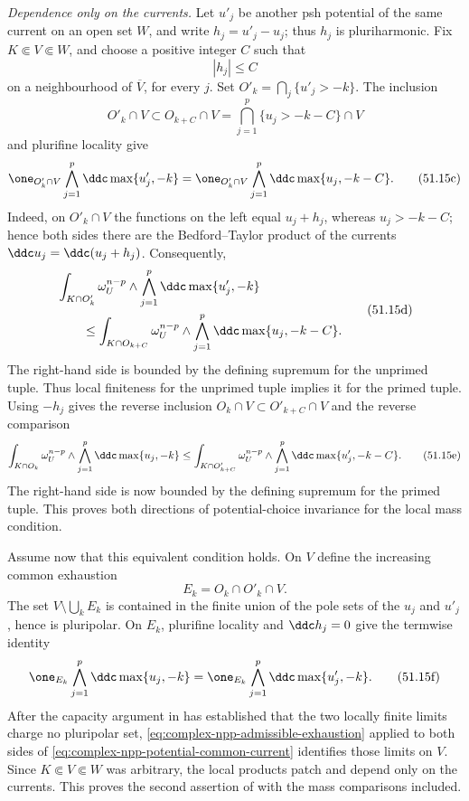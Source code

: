 \emph{Dependence only on the currents.}  Let $u'_j$ be another psh
potential of the same current on an open set $W$, and write
$h_j=u'_j-u_j$; thus $h_j$ is pluriharmonic.  Fix
$K\Subset V\Subset W$, and choose a positive integer $C$ such that
\[
                         |h_j|\leq C
\]
on a neighbourhood of $\overline V$, for every $j$.  Set
$O'_k=\bigcap_j\{u'_j>-k\}$.  The inclusion
\[
 O'_k\cap V\subset O_{k+C}\cap V
       =\bigcap_{j=1}^p\{u_j>-k-C\}\cap V
\tag{51.15b}\label{eq:complex-npp-potential-locus-forward}
\]
and plurifine locality give
\[
 \one_{O'_k\cap V}\bigwedge_{j=1}^p\ddc\max\{u'_j,-k\}
 =\one_{O'_k\cap V}\bigwedge_{j=1}^p\ddc\max\{u_j,-k-C\}.
\tag{51.15c}\label{eq:complex-npp-potential-current-forward}
\]
Indeed, on $O'_k\cap V$ the functions on the left equal $u_j+h_j$,
whereas $u_j>-k-C$; hence both sides there are the Bedford--Taylor product
of the currents $\ddc u_j=\ddc(u_j+h_j)$.  Consequently,
\[
\begin{aligned}
 &\int_{K\cap O'_k}\omega_U^{n-p}\wedge
       \bigwedge_{j=1}^p\ddc\max\{u'_j,-k\}\\
 &\qquad\leq
 \int_{K\cap O_{k+C}}\omega_U^{n-p}\wedge
       \bigwedge_{j=1}^p\ddc\max\{u_j,-k-C\}.
\end{aligned}
\tag{51.15d}\label{eq:complex-npp-potential-mass-forward}
\]
The right-hand side is bounded by the defining supremum for the unprimed
tuple.  Thus local finiteness for the unprimed tuple implies it for the
primed tuple.  Using $-h_j$ gives the reverse inclusion
$O_k\cap V\subset O'_{k+C}\cap V$ and the reverse comparison
\[
 \int_{K\cap O_k}\omega_U^{n-p}\wedge
       \bigwedge_{j=1}^p\ddc\max\{u_j,-k\}
 \leq
 \int_{K\cap O'_{k+C}}\omega_U^{n-p}\wedge
       \bigwedge_{j=1}^p\ddc\max\{u'_j,-k-C\}.
\tag{51.15e}\label{eq:complex-npp-potential-mass-reverse}
\]
The right-hand side is now bounded by the defining supremum for the primed
tuple.  This proves both directions of potential-choice invariance for the
local mass condition.

Assume now that this equivalent condition holds.  On $V$ define the
increasing common exhaustion
\[
                         E_k=O_k\cap O'_k\cap V.
\]
The set $V\setminus\bigcup_kE_k$ is contained in the finite union of the
pole sets of the $u_j$ and $u'_j$, hence is pluripolar.  On $E_k$,
plurifine locality and $\ddc h_j=0$ give the termwise identity
\[
 \one_{E_k}\bigwedge_{j=1}^p\ddc\max\{u_j,-k\}
 =\one_{E_k}\bigwedge_{j=1}^p\ddc\max\{u'_j,-k\}.
\tag{51.15f}\label{eq:complex-npp-potential-common-current}
\]
After the capacity argument in  has established
that the two locally finite limits charge no pluripolar set,
\eqref{eq:complex-npp-admissible-exhaustion} applied to both sides of
\eqref{eq:complex-npp-potential-common-current} identifies those limits on
$V$.  Since $K\Subset V\Subset W$ was arbitrary, the local products patch
and depend only on the currents.  This proves the second assertion of
\cite[Proposition~1.4]{BEGZ10} with the mass comparisons included.

